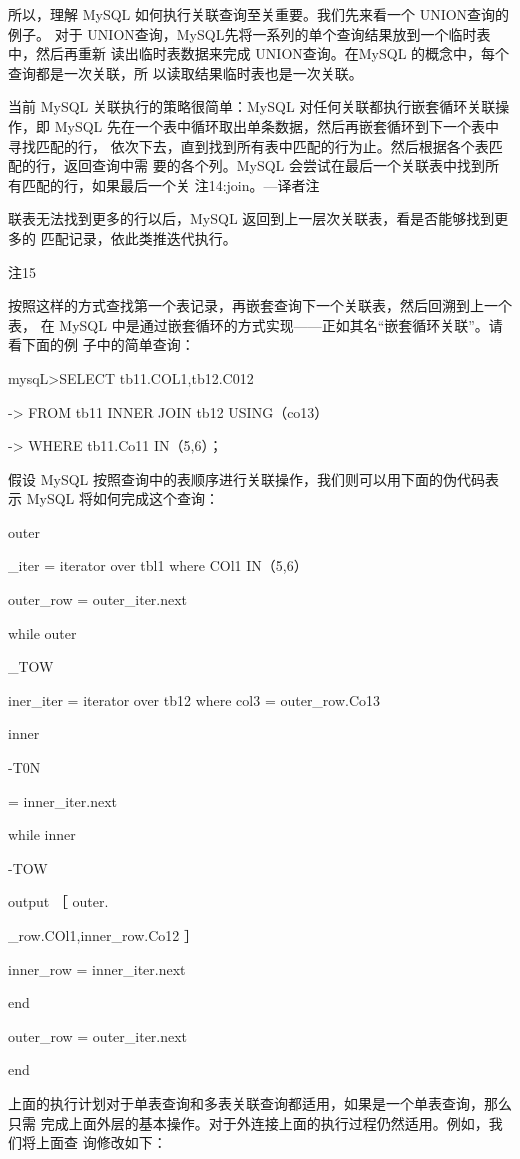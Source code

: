 所以，理解 MySQL 如何执行关联查询至关重要。我们先来看一个 UNION查询的例子。
对于 UNION查询，MySQL先将一系列的单个查询结果放到一个临时表中，然后再重新
读出临时表数据来完成 UNION查询。在MySQL 的概念中，每个查询都是一次关联，所
以读取结果临时表也是一次关联。

当前 MySQL 关联执行的策略很简单：MySQL 对任何关联都执行嵌套循环关联操作，即
MySQL 先在一个表中循环取出单条数据，然后再嵌套循环到下一个表中寻找匹配的行，
依次下去，直到找到所有表中匹配的行为止。然后根据各个表匹配的行，返回查询中需
要的各个列。MySQL 会尝试在最后一个关联表中找到所有匹配的行，如果最后一个关
注14:join。—译者注

联表无法找到更多的行以后，MySQL 返回到上一层次关联表，看是否能够找到更多的
匹配记录，依此类推迭代执行。

注15

按照这样的方式查找第一个表记录，再嵌套查询下一个关联表，然后回溯到上一个表，
在 MySQL 中是通过嵌套循环的方式实现——正如其名“嵌套循环关联”。请看下面的例
子中的简单查询：

mysqL>SELECT tb11.COL1,tb12.C012

-> FROM tb11 INNER JOIN tb12 USING（co13）

-> WHERE tb11.Co11 IN（5,6）；

假设 MySQL 按照查询中的表顺序进行关联操作，我们则可以用下面的伪代码表示
MySQL 将如何完成这个查询：

outer

\_iter = iterator over tbl1 where COl1 IN（5,6）

outer\_row = outer\_iter.next

while outer

\_TOW

iner\_iter = iterator over tb12 where col3 = outer\_row.Co13

inner

-T0N

= inner\_iter.next

while inner

-TOW

output ［ outer.

\_row.COl1,inner\_row.Co12 ］

inner\_row = inner\_iter.next

end

outer\_row = outer\_iter.next

end

上面的执行计划对于单表查询和多表关联查询都适用，如果是一个单表查询，那么只需
完成上面外层的基本操作。对于外连接上面的执行过程仍然适用。例如，我们将上面查
询修改如下：

